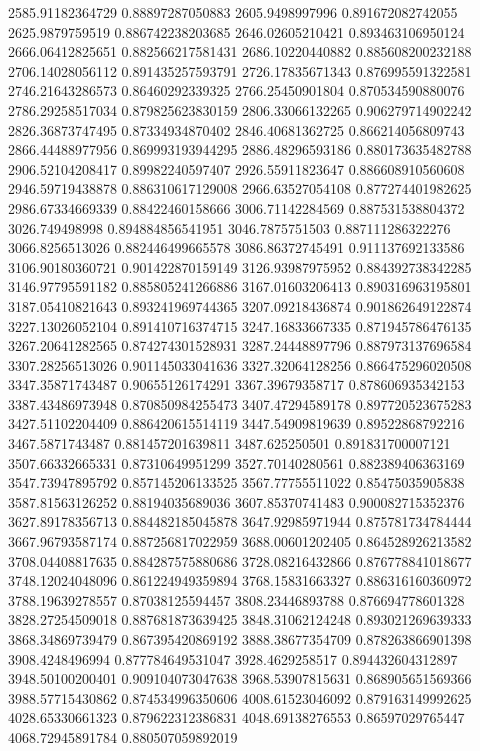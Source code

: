 {2585.91182364729 0.88897287050883
2605.9498997996 0.891672082742055
2625.9879759519 0.886742238203685
2646.02605210421 0.893463106950124
2666.06412825651 0.882566217581431
2686.10220440882 0.885608200232188
2706.14028056112 0.891435257593791
2726.17835671343 0.876995591322581
2746.21643286573 0.86460292339325
2766.25450901804 0.870534590880076
2786.29258517034 0.879825623830159
2806.33066132265 0.906279714902242
2826.36873747495 0.87334934870402
2846.40681362725 0.866214056809743
2866.44488977956 0.869993193944295
2886.48296593186 0.880173635482788
2906.52104208417 0.89982240597407
2926.55911823647 0.886608910560608
2946.59719438878 0.886310617129008
2966.63527054108 0.877274401982625
2986.67334669339 0.88422460158666
3006.71142284569 0.887531538804372
3026.749498998 0.894884856541951
3046.7875751503 0.887111286322276
3066.8256513026 0.882446499665578
3086.86372745491 0.911137692133586
3106.90180360721 0.901422870159149
3126.93987975952 0.884392738342285
3146.97795591182 0.885805241266886
3167.01603206413 0.890316963195801
3187.05410821643 0.893241969744365
3207.09218436874 0.901862649122874
3227.13026052104 0.891410716374715
3247.16833667335 0.871945786476135
3267.20641282565 0.874274301528931
3287.24448897796 0.887973137696584
3307.28256513026 0.901145033041636
3327.32064128256 0.866475296020508
3347.35871743487 0.90655126174291
3367.39679358717 0.878606935342153
3387.43486973948 0.870850984255473
3407.47294589178 0.897720523675283
3427.51102204409 0.886420615514119
3447.54909819639 0.89522868792216
3467.5871743487 0.881457201639811
3487.625250501 0.891831700007121
3507.66332665331 0.87310649951299
3527.70140280561 0.882389406363169
3547.73947895792 0.857145206133525
3567.77755511022 0.85475035905838
3587.81563126252 0.88194035689036
3607.85370741483 0.900082715352376
3627.89178356713 0.884482185045878
3647.92985971944 0.875781734784444
3667.96793587174 0.887256817022959
3688.00601202405 0.864528926213582
3708.04408817635 0.884287575880686
3728.08216432866 0.876778841018677
3748.12024048096 0.861224949359894
3768.15831663327 0.886316160360972
3788.19639278557 0.87038125594457
3808.23446893788 0.876694778601328
3828.27254509018 0.887681873639425
3848.31062124248 0.893021269639333
3868.34869739479 0.867395420869192
3888.38677354709 0.878263866901398
3908.4248496994 0.877784649531047
3928.4629258517 0.894432604312897
3948.50100200401 0.909104073047638
3968.53907815631 0.868905651569366
3988.57715430862 0.874534996350606
4008.61523046092 0.879163149992625
4028.65330661323 0.879622312386831
4048.69138276553 0.86597029765447
4068.72945891784 0.880507059892019
}
